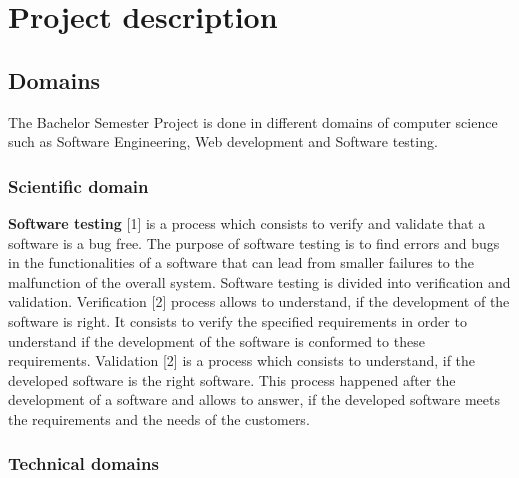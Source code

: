 \documentclass[conference,compsoc]{IEEEtran}
\begin{document}
\section{Project description}
\subsection{Domains}
The Bachelor Semester Project is done in different domains of computer science such as Software Engineering, Web development and Software testing. 

\subsubsection{Scientific domain}

\textbf{Software testing} [1] is a process which consists to verify and validate that a software is a bug free. The purpose of software testing is to find errors and bugs in the functionalities of a software that can lead from smaller failures to the malfunction of the overall system. Software testing is divided into verification and validation.     
\newline                                                                                                                       
Verification [2] process allows to understand, if the development of the software is right. It consists to verify the specified requirements in order to understand if the development of the software is conformed to these requirements.      
\newline                                                                                                                     
Validation [2] is a process which consists to understand, if the developed software is the right software. This process happened after the development of a software and allows to answer, if the developed software meets the requirements and the needs of the customers. 
                                              
\subsubsection{Technical domains} 
\end{document}

